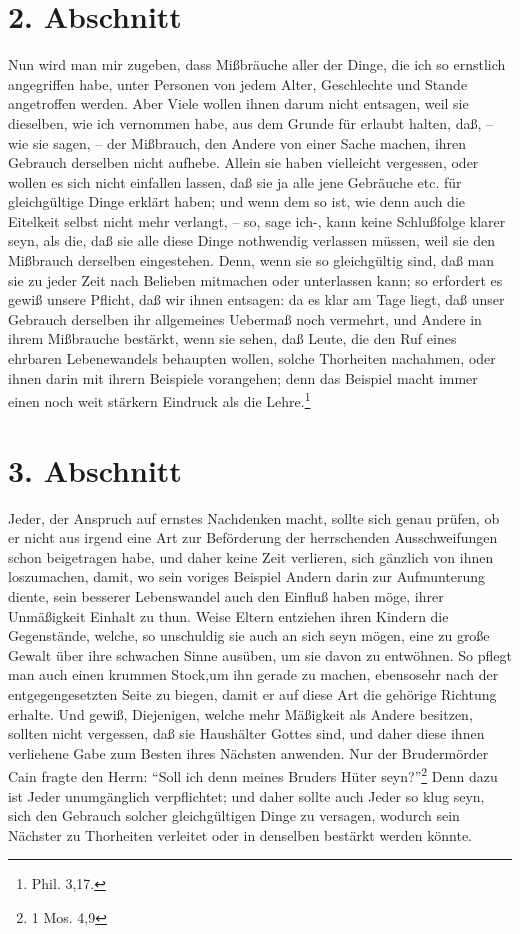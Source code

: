 \section{2. Abschnitt} \label{kap18_ab2}

Nun wird man mir zugeben, dass Mißbräuche aller der Dinge, die ich so ernstlich
angegriffen habe, unter Personen von jedem Alter, Geschlechte und Stande
angetroffen werden. Aber Viele wollen ihnen darum nicht entsagen, weil sie
dieselben, wie ich vernommen habe, aus dem Grunde für erlaubt halten, daß, --
wie sie sagen, -- der Mißbrauch, den Andere von einer Sache  machen, ihren
Gebrauch derselben nicht aufhebe. Allein sie haben vielleicht vergessen, oder
wollen es sich nicht einfallen lassen, daß sie ja alle jene Gebräuche etc. für
gleichgültige Dinge erklärt haben; und wenn dem so ist, wie denn auch die
Eitelkeit selbst nicht mehr verlangt, -- so, sage ich-, kann keine Schlußfolge
klarer seyn, als die, daß sie alle diese Dinge nothwendig verlassen müssen, weil
sie den Mißbrauch derselben eingestehen. Denn, wenn sie so gleichgültig sind,
daß man sie zu jeder Zeit nach Belieben mitmachen oder unterlassen kann; so
erfordert es gewiß unsere Pflicht, daß wir ihnen entsagen: da es klar am Tage
liegt, daß unser Gebrauch derselben ihr allgemeines Uebermaß noch vermehrt, und
Andere in ihrem Mißbrauche bestärkt, wenn sie sehen, daß Leute, die den Ruf
eines ehrbaren Lebenewandels behaupten wollen, solche Thorheiten nachahmen, oder
ihnen darin mit ihrern Beispiele vorangehen; denn das Beispiel macht immer einen
noch weit stärkern Eindruck als die Lehre.\footnote{Phil. 3,17.}

\section{3. Abschnitt} \label{kap18_ab3}

Jeder, der Anspruch auf ernstes Nachdenken macht, sollte sich genau prüfen, ob
er nicht aus irgend eine Art zur Beförderung der herrschenden Ausschweifungen
schon beigetragen habe, und daher keine Zeit verlieren, sich gänzlich von ihnen
loszumachen, damit, wo sein voriges Beispiel Andern darin zur Aufmunterung
diente, sein besserer Lebenswandel auch den Einfluß haben möge, ihrer
Unmäßigkeit Einhalt zu thun. Weise Eltern entziehen ihren Kindern die
Gegenstände, welche, so unschuldig sie auch an sich seyn mögen, eine zu große
Gewalt über ihre schwachen Sinne ausüben, um sie davon zu entwöhnen. So pflegt
man auch einen krummen Stock,um ihn gerade zu machen, ebensosehr nach der
entgegengesetzten Seite zu biegen, damit er auf diese Art die gehörige Richtung
erhalte. Und gewiß, Diejenigen, welche mehr Mäßigkeit als Andere besitzen,
sollten nicht vergessen, daß sie Haushälter Gottes sind, und daher diese ihnen
verliehene Gabe zum Besten ihres Nächsten anwenden. Nur der Brudermörder Cain
fragte den Herrn: "`Soll ich denn meines Bruders Hüter seyn?"'\footnote{1 Mos.
4,9} Denn dazu ist Jeder unumgänglich verpflichtet; und daher sollte auch Jeder
so klug seyn, sich den Gebrauch solcher gleichgültigen Dinge zu versagen,
wodurch sein Nächster zu Thorheiten verleitet oder in denselben bestärkt werden
könnte.

